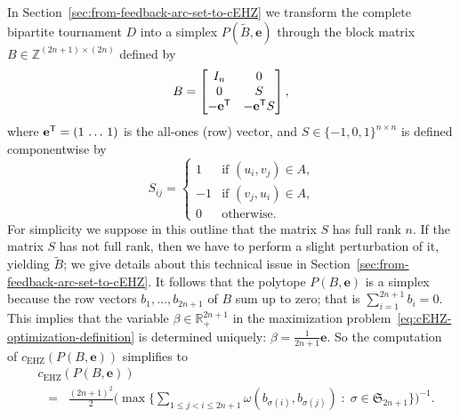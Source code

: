 \documentclass{amsart}
\newcommand{\Z}{\mathbb{Z}}
\newcommand{\cEHZ}{c_{\mathrm{EHZ}}}
\newcommand{\permS}{\mathfrak{S}}
\begin{document}
\smallskip

In Section~\ref{sec:from-feedback-arc-set-to-cEHZ} we transform the complete bipartite tournament 
$D$ into a simplex $P(\tilde{B},\textbf{e})$ through the block matrix
$B \in \Z^{(2n+1)\times (2n)}$ defined by
\[
    B = \begin{bmatrix}
    I_n & 0\\
    0 & S\\
    -\mathbf{e}^{\sf T} & -\mathbf{e}^{\sf T} S
  \end{bmatrix},
\]
where $\mathbf{e}^{\sf T} = (1 \, \ldots \, 1)$ is the all-ones (row)
vector, and $S \in \{-1,0,1\}^{n \times n}$ is defined componentwise
by
\begin{equation}\label{eq:simplex}
  S_{ij} = \begin{cases}
    1 & \text{if $(u_i, v_j) \in A$,}\\
    -1 & \text{if $(v_j, u_i) \in A$,}\\
    0 & \text{otherwise.}
    \end{cases}
\end{equation}
For simplicity we suppose in this outline that the matrix $S$ has full rank
$n$. If the matrix $S$ has not full rank, then we have to perform a
slight perturbation of it, yielding $\tilde{B}$; we give details about this technical issue
in Section~\ref{sec:from-feedback-arc-set-to-cEHZ}. It follows that
the polytope $P(B,\mathbf{e})$ is a simplex because the row vectors
$b_1, \ldots, b_{2n+1}$ of $B$ sum up to zero; that is $\sum_{i=1}^{2n+1}b_i=0$. 
This implies that the
variable $\beta \in \mathbb{R}^{2n+1}_+$ in the maximization
problem~\eqref{eq:cEHZ-optimization-definition} is determined
uniquely: $\beta = \frac{1}{2n+1} \mathbf{e}$. So the computation of
$\cEHZ(P(B,\mathbf{e}))$ simplifies to
\begin{equation}
  \label{eq:cEHZ-simplified}
\begin{split}
&  \cEHZ(P(B,\mathbf{e})) \\
& \;\;   = \; \;\frac{(2n+1)^2}{2} \bigg(\max\bigg\{\sum_{1 \leq j < i \leq 2n+1}
  \omega(b_{\sigma(i)},
  b_{\sigma(j)}) \; : \; \sigma \in \permS_{2n+1} \bigg\}\bigg)^{-1}.
\end{split}
\end{equation}
\end{document}
